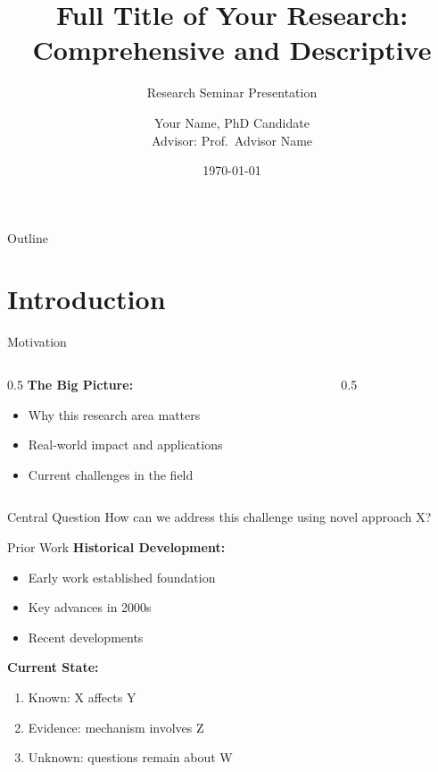 \documentclass[aspectratio=169,11pt]{beamer}
\title[Short Title]{Full Title of Your Research:\\Comprehensive and Descriptive}
\subtitle{Research Seminar Presentation}
\author[Your Name]{Your Name, PhD Candidate\\
  Advisor: Prof.\ Advisor Name}
\institute[University]{
  Department of Your Field\\
  University Name\\
  \texttt{yourname@university.edu}
}
\date{\today}
\begin{document}
\begin{frame}[plain]
  \titlepage
\end{frame}

\begin{frame}{Outline}
  \tableofcontents
\end{frame}

\section{Introduction}

\begin{frame}{Motivation}
  \begin{columns}[T]
    \begin{column}{0.5\textwidth}
      \textbf{The Big Picture:}
      \begin{itemize}
        \item Why this research area matters
        \item Real-world impact and applications
        \item Current challenges in the field
      \end{itemize}
    \end{column}
    \begin{column}{0.5\textwidth}
    \end{column}
  \end{columns}
  \vspace{0.5cm}
  \begin{block}{Central Question}
    How can we address this challenge using novel approach X?
  \end{block}
\end{frame}

\begin{frame}{Prior Work}
  \textbf{Historical Development:}
  \begin{itemize}
    \item Early work established foundation \cite{foundational}
    \item Key advances in 2000s \cite{advance2005}
    \item Recent developments \cite{recent2022}
  \end{itemize}
  \vspace{0.5cm}
  \textbf{Current State:}
  \begin{enumerate}
    \item Known: X affects Y
    \item Evidence: mechanism involves Z
    \item Unknown: questions remain about W
  \end{enumerate}
\end{frame}
\end{document}
